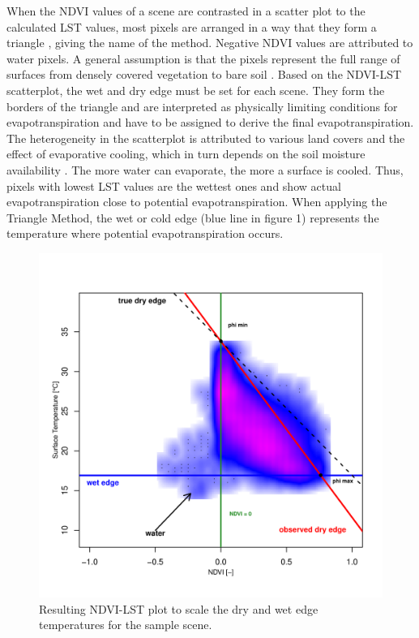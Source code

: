 \documentclass[12pt]{article}
\begin{document}
When the NDVI values of a scene are contrasted in a scatter plot to the calculated LST values, most pixels are arranged in a way that they form a triangle \citep{Carlson2007}, giving the name of the method. Negative NDVI values are attributed to water pixels. A general assumption is that the pixels represent the full range of surfaces from densely covered vegetation to bare soil \citep{Carlson2007}. Based on the NDVI-LST scatterplot, the wet and dry edge must be set for each scene. They form the borders of the triangle and are interpreted as physically limiting conditions for evapotranspiration \citep{Batraetal2006} and have to be assigned to derive the final evapotranspiration. The heterogeneity in the scatterplot is attributed to various land covers and the effect of evaporative cooling, which in turn depends on the soil moisture availability \citep{Stisenetal2008}. The more water can evaporate, the more a surface is cooled. Thus, pixels with lowest LST values are the wettest ones and show actual evapotranspiration close to potential evapotranspiration. When applying the Triangle Method, the wet or cold edge (blue line in figure 1) represents the temperature where potential evapotranspiration occurs. 

\begin{figure}[htbp]
\centering
\includegraphics[width=1\linewidth]{NDVI-LST-plot} 
\caption{Resulting NDVI-LST plot to scale the dry and wet edge temperatures for the sample scene.}
\label{figure:ndvilstplot}
\end{figure}
\end{document}
